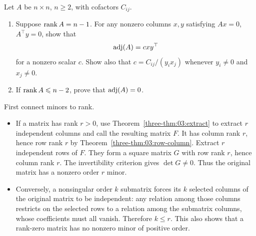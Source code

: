 \begin{problem}\label{ex:05:adjugate-rank}
Let \(A\) be \(n\times n\), \(n\geqslant2\), with cofactors \(C_{ij}\).
\begin{enumerate}
\item Suppose \(\operatorname{rank} A=n-1\). For any nonzero columns \(x,y\) satisfying
\(Ax=0\), \(A^\top y=0\), show that
\[
\operatorname{adj}(A)=cxy^\top
\]
for a nonzero scalar \(c\). Show also that
\(c=C_{ij}/(y_i x_j)\) whenever \(y_i\ne0\) and \(x_j\ne0\).
\item If \(\operatorname{rank} A\leqslant n-2\), prove that \(\operatorname{adj}(A)=0\).
\end{enumerate}
\end{problem}
\begin{solution}
First connect minors to rank.
\begin{itemize}
\item If a matrix has rank \(r>0\), use Theorem~\ref{three-thm:03:extract}
to extract \(r\) independent columns and call
the resulting matrix \(F\). It has column rank \(r\), hence row rank \(r\)
by Theorem~\ref{three-thm:03:row-column}.
Extract \(r\) independent rows of \(F\). They form a square matrix \(G\)
with row rank \(r\), hence column rank \(r\). The invertibility criterion
gives \(\det G\ne0\). Thus the original matrix has a nonzero order \(r\) minor.
\item Conversely, a nonsingular order \(k\) submatrix forces its \(k\) selected
columns of the original matrix to be independent: any relation among
those columns restricts on the selected rows to a relation among the
submatrix columns, whose coefficients must all vanish. Therefore \(k\leqslant r\).
This also shows that a rank-zero matrix has no nonzero minor of positive order.
\end{itemize}
\label{proof:05:minor-rank-bridge}


\end{solution}
